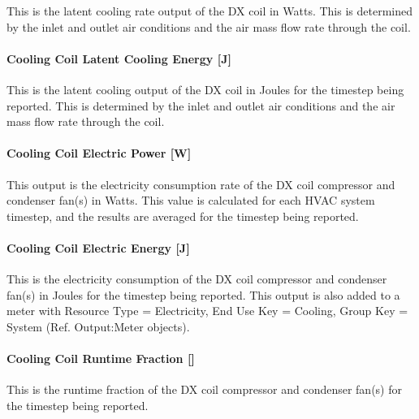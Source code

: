 This is the latent cooling rate output of the DX coil in Watts. This is determined by the inlet and outlet air conditions and the air mass flow rate through the coil.

\paragraph{Cooling Coil Latent Cooling Energy {[}J{]}}\label{cooling-coil-latent-cooling-energy-j}

This is the latent cooling output of the DX coil in Joules for the timestep being reported. This is determined by the inlet and outlet air conditions and the air mass flow rate through the coil.

\paragraph{Cooling Coil Electric Power {[}W{]}}\label{cooling-coil-electric-power-w}

This output is the electricity consumption rate of the DX coil compressor and condenser fan(s) in Watts. This value is calculated for each HVAC system timestep, and the results are averaged for the timestep being reported.

\paragraph{Cooling Coil Electric Energy {[}J{]}}\label{cooling-coil-electric-energy-j}

This is the electricity consumption of the DX coil compressor and condenser fan(s) in Joules for the timestep being reported. This output is also added to a meter with Resource Type = Electricity, End Use Key = Cooling, Group Key = System (Ref. Output:Meter objects).

\paragraph{Cooling Coil Runtime Fraction {[]}}\label{cooling-coil-runtime-fraction}

This is the runtime fraction of the DX coil compressor and condenser fan(s) for the timestep being reported.
